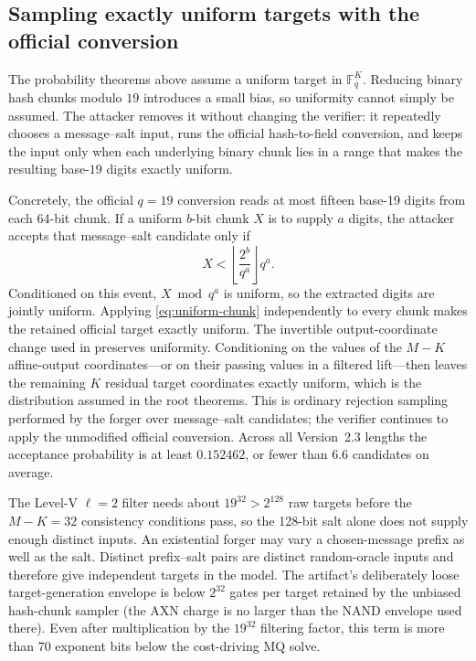 \documentclass[11pt]{article}
\newcommand{\F}{\mathbb F}
\begin{document}
\subsection{Sampling exactly uniform targets with the official conversion}

The probability theorems above assume a uniform target in $\F_q^K$.  Reducing
binary hash chunks modulo $19$ introduces a small bias, so uniformity cannot
simply be assumed.  The attacker removes it without changing the verifier: it
repeatedly chooses a message--salt input, runs the official hash-to-field
conversion, and keeps the input only when each underlying binary chunk lies in
a range that makes the resulting base-$19$ digits exactly uniform.

Concretely, the official $q=19$ conversion reads at most fifteen base-19 digits
from each 64-bit chunk.  If a uniform $b$-bit chunk $X$ is to supply $a$
digits, the attacker accepts that message--salt candidate only if
\begin{equation}\label{eq:uniform-chunk}
 X<\left\lfloor\frac{2^b}{q^a}\right\rfloor q^a.
\end{equation}
Conditioned on this event, $X\bmod q^a$ is uniform, so the extracted
digits are jointly uniform.  Applying \eqref{eq:uniform-chunk} independently
to every chunk makes the retained official target exactly uniform.  The
invertible output-coordinate change used in 
preserves uniformity.  Conditioning on the values of the $M-K$ affine-output coordinates---or on
their passing values in a filtered lift---then leaves the remaining $K$
residual target coordinates exactly uniform, which is the distribution
assumed in the root theorems.  This is
ordinary rejection sampling performed by the forger over message--salt
candidates; the verifier continues to apply the unmodified official
conversion.  Across all Version~2.3 lengths the acceptance probability is at
least $0.152462$, or fewer than 6.6 candidates on average.

The Level-V $\ell=2$ filter needs about $19^{32}>2^{128}$ raw targets before
the $M-K=32$ consistency conditions pass, so the 128-bit salt alone does not
supply enough distinct inputs.  An existential forger may vary a chosen-message
prefix as well as the salt.  Distinct prefix--salt pairs are distinct random-oracle
inputs and therefore give independent targets in the model.  The
artifact's deliberately loose target-generation envelope is below $2^{32}$
gates per target retained by the unbiased hash-chunk sampler (the AXN charge
is no larger than the NAND envelope used there).  Even after multiplication by the $19^{32}$ filtering factor,
this term is more than 70 exponent bits below the cost-driving MQ solve.
\end{document}
